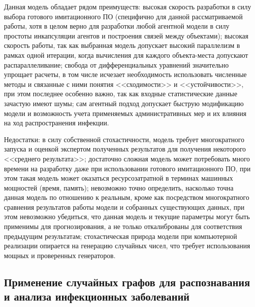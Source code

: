 	



Данная модель обладает рядом преимуществ: высокая скорость разработки в силу выбора готового имитационного ПО (специфично для данной рассматриваемой работы, хотя в целом верно для разработки любой агентной модели в силу простоты инкапсуляции агентов и построения связей между объектами); высокая скорость работы, так как выбранная модель допускает высокий параллелизм в рамках одной итерации, когда вычисления для каждого объекта-места допускают распараллеливание; свобода от дифференциальных уравнений значительно упрощает расчеты, в том числе исчезает необходимость использовать численные методы и связанные с ними понятия <<сходимости>> и <<устойчивости>>, при этом последнее особенно важно, так как входные статистические данные зачастую имеют шумы;  сам агентный подход допускает быструю модификацию модели и возможность учета применяемых административных мер  и их влияния на ход распространения инфекции.

Недостатки: в силу собственной стохастичности, модель требует многократного запуска  и оценкой экспертом полученных результатов для получения некоторого <<среднего результата>>; достаточно сложная модель может потребовать много времени на разработку даже при использовании готового имитационного ПО, при этом такая модель может оказаться ресурсозатратной в терминах машинных мощностей (время, память); невозможно точно определить, насколько точна данная модель по отношению к реальным, кроме как посредством многократного сравнения результатов работы модели и собранных существующих данных, при этом невозможно убедиться, что данная модель и текущие параметры могут быть применимы для прогнозирования, а не только откалиброваны для соответствия предыдущим результатам; стохастическая природа модели при компьютерной реализации опирается на генерацию случайных чисел, что требует использования мощных и проверенных генераторов. 

\subsection{Применение случайных графов для распознавания и анализа инфекционных заболеваний}

